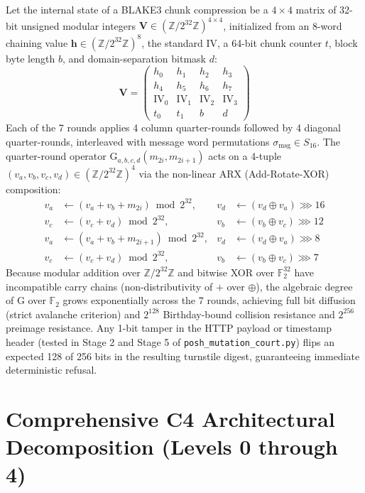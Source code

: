 \documentclass[10pt,twoside,openany]{book}
\theoremstyle{plain}
\theoremstyle{definition}
\theoremstyle{remark}
\newcommand{\Z}{\mathbb{Z}}
\newcommand{\F}{\mathbb{F}}
\begin{document}
Let the internal state of a BLAKE3 chunk compression be a $4 \times 4$ matrix of 32-bit unsigned modular integers $\mathbf{V} \in (\Z/2^{32}\Z)^{4 \times 4}$, initialized from an 8-word chaining value $\mathbf{h} \in (\Z/2^{32}\Z)^8$, the standard IV, a 64-bit chunk counter $t$, block byte length $b$, and domain-separation bitmask $d$:
\begin{equation}
\mathbf{V} = \begin{pmatrix}
h_0 & h_1 & h_2 & h_3 \\
h_4 & h_5 & h_6 & h_7 \\
\mathrm{IV}_0 & \mathrm{IV}_1 & \mathrm{IV}_2 & \mathrm{IV}_3 \\
t_0 & t_1 & b & d
\end{pmatrix}
\end{equation}
Each of the 7 rounds applies 4 column quarter-rounds followed by 4 diagonal quarter-rounds, interleaved with message word permutations $\sigma_{\mathrm{msg}} \in S_{16}$. The quarter-round operator $\mathrm{G}_{a,b,c,d}(m_{2i}, m_{2i+1})$ acts on a 4-tuple $(v_a, v_b, v_c, v_d) \in (\Z/2^{32}\Z)^4$ via the non-linear ARX (Add-Rotate-XOR) composition:
\begin{align}
v_a &\gets (v_a + v_b + m_{2i}) \bmod 2^{32}, & v_d &\gets (v_d \oplus v_a) \ggg 16 \\
v_c &\gets (v_c + v_d) \bmod 2^{32}, & v_b &\gets (v_b \oplus v_c) \ggg 12 \\
v_a &\gets (v_a + v_b + m_{2i+1}) \bmod 2^{32}, & v_d &\gets (v_d \oplus v_a) \ggg 8 \\
v_c &\gets (v_c + v_d) \bmod 2^{32}, & v_b &\gets (v_b \oplus v_c) \ggg 7
\end{align}
Because modular addition over $\Z/2^{32}\Z$ and bitwise XOR over $\F_2^{32}$ have incompatible carry chains (non-distributivity of $+$ over $\oplus$), the algebraic degree of $\mathrm{G}$ over $\F_2$ grows exponentially across the 7 rounds, achieving full bit diffusion (strict avalanche criterion) and $2^{128}$ Birthday-bound collision resistance and $2^{256}$ preimage resistance. Any 1-bit tamper in the HTTP payload or timestamp header (tested in Stage 2 and Stage 5 of \texttt{posh\_mutation\_court.py}) flips an expected 128 of 256 bits in the resulting turnstile digest, guaranteeing immediate deterministic refusal.

\chapter{Comprehensive C4 Architectural Decomposition (Levels 0 through 4)}
\end{document}
